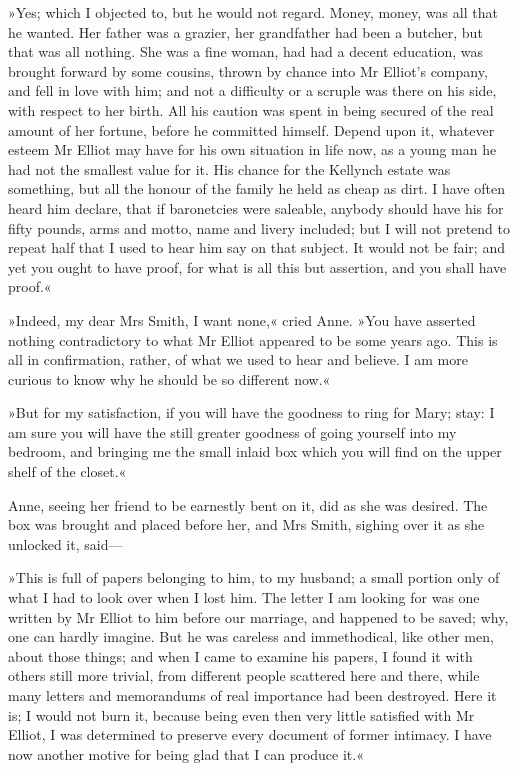 »Yes; which I objected to, but he would not regard. Money, money, was all that he wanted. Her father was a grazier, her grandfather had been a butcher, but that was all nothing. She was a fine woman, had had a decent education, was brought forward by some cousins, thrown by chance into Mr Elliot's company, and fell in love with him; and not a difficulty or a scruple was there on his side, with respect to her birth. All his caution was spent in being secured of the real amount of her fortune, before he committed himself. Depend upon it, whatever esteem Mr Elliot may have for his own situation in life now, as a young man he had not the smallest value for it. His chance for the Kellynch estate was something, but all the honour of the family he held as cheap as dirt. I have often heard him declare, that if baronetcies were saleable, anybody should have his for fifty pounds, arms and motto, name and livery included; but I will not pretend to repeat half that I used to hear him say on that subject. It would not be fair; and yet you ought to have proof, for what is all this but assertion, and you shall have proof.«

»Indeed, my dear Mrs Smith, I want none,« cried Anne. »You have asserted nothing contradictory to what Mr Elliot appeared to be some years ago. This is all in confirmation, rather, of what we used to hear and believe. I am more curious to know why he should be so different now.«

»But for my satisfaction, if you will have the goodness to ring for Mary; stay: I am sure you will have the still greater goodness of going yourself into my bedroom, and bringing me the small inlaid box which you will find on the upper shelf of the closet.«

Anne, seeing her friend to be earnestly bent on it, did as she was desired. The box was brought and placed before her, and Mrs Smith, sighing over it as she unlocked it, said—

»This is full of papers belonging to him, to my husband; a small portion only of what I had to look over when I lost him. The letter I am looking for was one written by Mr Elliot to him before our marriage, and happened to be saved; why, one can hardly imagine. But he was careless and immethodical, like other men, about those things; and when I came to examine his papers, I found it with others still more trivial, from different people scattered here and there, while many letters and memorandums of real importance had been destroyed. Here it is; I would not burn it, because being even then very little satisfied with Mr Elliot, I was determined to preserve every document of former intimacy. I have now another motive for being glad that I can produce it.«

